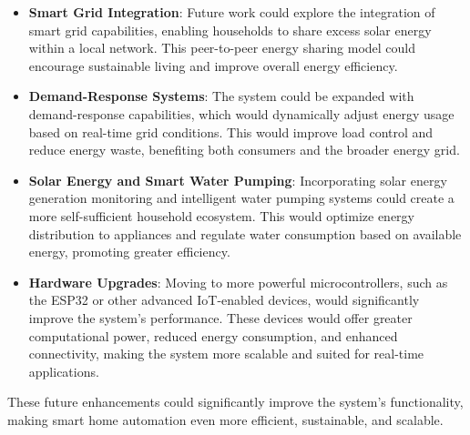 \documentclass[a4paper,12pt]{report}
\begin{document}
 \begin{itemize}
     \item \textbf{Smart Grid Integration}: Future work could explore the integration of smart grid capabilities, enabling households to share excess solar energy within a local network. This peer-to-peer energy sharing model could encourage sustainable living and improve overall energy efficiency.
     
     \item \textbf{Demand-Response Systems}: The system could be expanded with demand-response capabilities, which would dynamically adjust energy usage based on real-time grid conditions. This would improve load control and reduce energy waste, benefiting both consumers and the broader energy grid.
     
     \item \textbf{Solar Energy and Smart Water Pumping}: Incorporating solar energy generation monitoring and intelligent water pumping systems could create a more self-sufficient household ecosystem. This would optimize energy distribution to appliances and regulate water consumption based on available energy, promoting greater efficiency.
     
     \item \textbf{Hardware Upgrades}: Moving to more powerful microcontrollers, such as the ESP32 or other advanced IoT-enabled devices, would significantly improve the system’s performance. These devices would offer greater computational power, reduced energy consumption, and enhanced connectivity, making the system more scalable and suited for real-time applications.
 \end{itemize}
 
 These future enhancements could significantly improve the system's functionality, making smart home automation even more efficient, sustainable, and scalable.
 
 
 


\newpage
\renewcommand{\bibname}{References}



\end{document}
